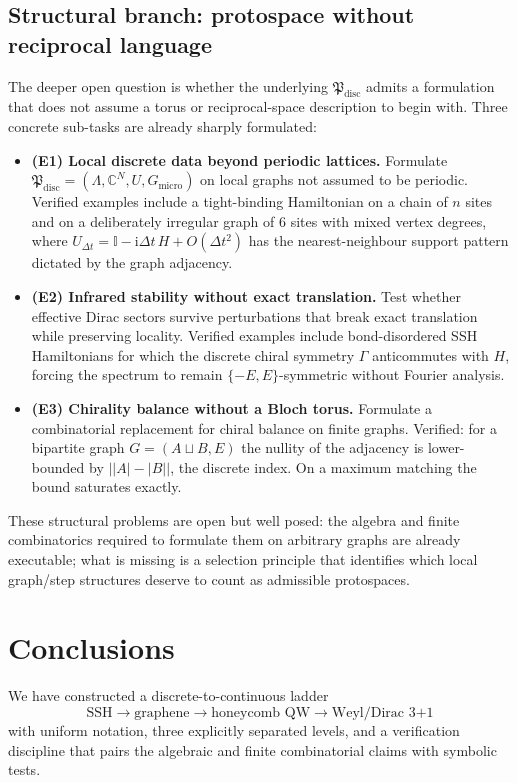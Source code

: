 \documentclass[a4paper,onecolumn,11pt]{quantumarticle}
\newcommand{\ii}{\ensuremath{\mathrm{i}}}
\newcommand{\bbI}{\ensuremath{\mathbb{I}}}
\newcommand{\bbC}{\ensuremath{\mathbb{C}}}
\newcommand{\Hop}{\ensuremath{H}}
\newcommand{\Uop}{\ensuremath{U}}
\newcommand{\Lattice}{\ensuremath{\Lambda}}
\newcommand{\Proto}{\ensuremath{\mathfrak{P}_{\mathrm{disc}}}}
\begin{document}
\subsection{Structural branch: protospace without reciprocal language}
The deeper open question is whether the underlying $\Proto$ admits a formulation that does not assume a torus or reciprocal-space description to begin with. Three concrete sub-tasks are already sharply formulated:

\begin{itemize}[leftmargin=*]
\item \textbf{(E1) Local discrete data beyond periodic lattices.} Formulate $\Proto = (\Lattice,\bbC^{N},\Uop,G_{\mathrm{micro}})$ on local graphs not assumed to be periodic. Verified examples include a tight-binding Hamiltonian on a chain of $n$ sites and on a deliberately irregular graph of 6 sites with mixed vertex degrees, where $\Uop_{\Delta t} = \bbI - \ii\Delta t\,\Hop + O(\Delta t^{2})$ has the nearest-neighbour support pattern dictated by the graph adjacency.
\item \textbf{(E2) Infrared stability without exact translation.} Test whether effective Dirac sectors survive perturbations that break exact translation while preserving locality. Verified examples include bond-disordered SSH Hamiltonians for which the discrete chiral symmetry $\Gamma$ anticommutes with $\Hop$, forcing the spectrum to remain $\{-E,E\}$-symmetric without Fourier analysis.
\item \textbf{(E3) Chirality balance without a Bloch torus.} Formulate a combinatorial replacement for chiral balance on finite graphs. Verified: for a bipartite graph $G=(A\sqcup B,E)$ the nullity of the adjacency is lower-bounded by $\lvert\lvert A\rvert-\lvert B\rvert\rvert$, the discrete index. On a maximum matching the bound saturates exactly.
\end{itemize}

These structural problems are open but well posed: the algebra and finite combinatorics required to formulate them on arbitrary graphs are already executable; what is missing is a selection principle that identifies which local graph/step structures deserve to count as admissible protospaces.


\section{Conclusions}
\label{p:conclusions}

We have constructed a discrete-to-continuous ladder
\[
\text{SSH} \to \text{graphene} \to \text{honeycomb QW} \to \text{Weyl/Dirac 3+1}
\]
with uniform notation, three explicitly separated levels, and a verification discipline that pairs the algebraic and finite combinatorial claims with symbolic tests.
\end{document}
